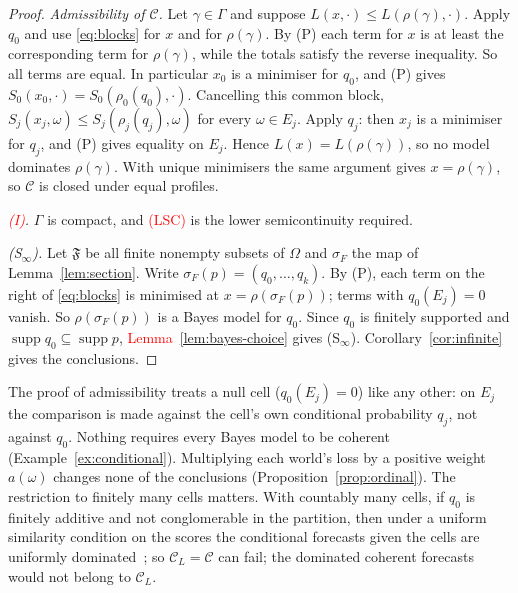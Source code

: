 \documentclass[11pt]{article}
\theoremstyle{definition}
\theoremstyle{remark}
\newcommand{\C}{\mathcal C}
\newcommand{\F}{\mathfrak F}
\newcommand{\supp}{\operatorname{supp}}
\begin{document}
\begin{proof}
\emph{Admissibility of $\C$.} Let $\gamma\in\Gamma$ and suppose $L(x,\cdot)\le L(\rho(\gamma),\cdot)$. Apply $q_0$ and use \eqref{eq:blocks} for $x$ and for $\rho(\gamma)$. By (P) each term for $x$ is at least the corresponding term for $\rho(\gamma)$, while the totals satisfy the reverse inequality. So all terms are equal. In particular $x_0$ is a minimiser for $q_0$, and (P) gives $S_0(x_0,\cdot)=S_0(\rho_0(q_0),\cdot)$. Cancelling this common block, $S_j(x_j,\omega)\le S_j(\rho_j(q_j),\omega)$ for every $\omega\in E_j$. Apply $q_j$: then $x_j$ is a minimiser for $q_j$, and (P) gives equality on $E_j$. Hence $L(x)=L(\rho(\gamma))$, so no model dominates $\rho(\gamma)$. With unique minimisers the same argument gives $x=\rho(\gamma)$, so $\C$ is closed under equal profiles.

\emph{\textcolor{red}{(I)}.} $\Gamma$ is compact, and \textcolor{red}{(LSC)} is the lower semicontinuity required.

\emph{(S$_\infty$).} Let $\F$ be all finite nonempty subsets of $\Omega$ and $\sigma_F$ the map of Lemma~\ref{lem:section}. Write $\sigma_F(p)=(q_0,\dots,q_k)$. By (P), each term on the right of \eqref{eq:blocks} is minimised at $x=\rho(\sigma_F(p))$; terms with $q_0(E_j)=0$ vanish. So $\rho(\sigma_F(p))$ is a Bayes model for $q_0$. Since $q_0$ is finitely supported and $\supp q_0\subseteq\supp p$, \textcolor{red}{Lemma~\ref{lem:bayes-choice}} gives (S$_\infty$). Corollary~\ref{cor:infinite} gives the conclusions.
\end{proof}
The proof of admissibility treats a null cell ($q_0(E_j)=0$) like any other: on $E_j$ the comparison is made against the cell's own conditional probability $q_j$, not against $q_0$. Nothing requires every Bayes model to be coherent (Example~\ref{ex:conditional}). Multiplying each world's loss by a positive weight $a(\omega)$ changes none of the conclusions (Proposition~\ref{prop:ordinal}). The restriction to finitely many cells matters. With countably many cells, if $q_0$ is finitely additive and not conglomerable in the partition, then under a uniform similarity condition on the scores the conditional forecasts given the cells are uniformly dominated~\cite[Theorem~2]{SSK14}; so $\C_L=\C$ can fail; the dominated coherent forecasts would not belong to $\C_L$.
\end{document}
